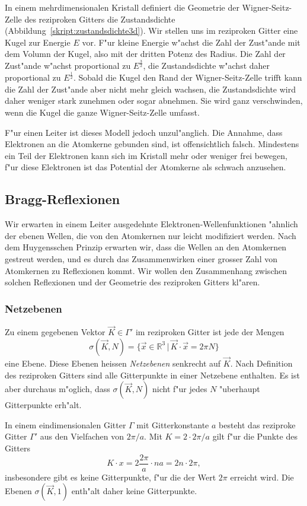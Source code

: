In einem mehrdimensionalen Kristall definiert die Geometrie der
Wigner-Seitz-Zelle des reziproken Gitters die Zustandsdichte
(Abbildung~\ref{skript:zustandsdichte3d}).
Wir stellen uns im reziproken Gitter eine Kugel zur Energie $E$ vor.
F"ur kleine Energie w"achst die Zahl der Zust"ande mit dem Volumn der
Kugel, also mit der dritten Potenz des Radius. Die Zahl der Zust"ande
w"achst proportional zu $E^{\frac32}$, die Zustandsdichte w"achst daher
proportional zu $E^{\frac12}$.
Sobald die Kugel den Rand der Wigner-Seitz-Zelle trifft kann die 
Zahl der Zust"ande aber nicht mehr gleich wachsen, die Zustandsdichte
wird daher weniger stark zunehmen oder sogar abnehmen.
Sie wird ganz verschwinden, wenn die Kugel die ganze Wigner-Seitz-Zelle
umfasst.

F"ur einen Leiter ist dieses Modell jedoch unzul"anglich.
Die Annahme, dass Elektronen an die Atomkerne gebunden sind, ist offensichtlich
falsch.
Mindestens ein Teil der Elektronen kann sich im Kristall mehr oder weniger
frei bewegen, f"ur diese Elektronen ist das Potential der Atomkerne
als schwach anzusehen.

\subsection{Bragg-Reflexionen}
Wir erwarten in einem Leiter ausgedehnte Elektronen-Wellenfunktionen
"ahnlich der ebenen Wellen, die von den Atomkernen nur leicht modifiziert
werden.
Nach dem Huygensschen Prinzip erwarten wir, dass die Wellen an den
Atomkernen gestreut werden, und es durch das Zusammenwirken einer grosser
Zahl von Atomkernen zu Reflexionen kommt.
Wir wollen den Zusammenhang zwischen solchen Reflexionen und der Geometrie
des reziproken Gitters kl"aren.

\subsubsection{Netzebenen}
Zu einem gegebenen Vektor $\vec K\in \Gamma'$ im reziproken Gitter ist
jede der Mengen
\[
\sigma(\vec K,N)=\{ \vec x\in \mathbb R^3\,|\, \vec K\cdot \vec x=2\pi N\}
\]
eine Ebene.
Diese Ebenen heissen {\em Netzebenen} senkrecht auf $\vec K$.
%
Nach Definition des reziproken Gitters sind alle Gitterpunkte in
einer Netzebene enthalten. 
Es ist aber durchaus m"oglich, dass $\sigma(\vec K,N)$ nicht
f"ur jedes $N$ "uberhaupt Gitterpunkte erh"alt.

\begin{beispiel}
In einem eindimensionalen Gitter $\Gamma$ mit Gitterkonstante $a$ besteht das
reziproke Gitter $\Gamma'$ aus den Vielfachen von $2\pi/a$.
Mit $K=2\cdot 2\pi/a$ gilt f"ur die Punkte des Gitters
\[
K\cdot x=2\frac{2\pi}a\cdot na=2n\cdot 2\pi,
\]
insbesondere gibt es keine Gitterpunkte, f"ur die der Wert $2\pi$
erreicht wird.
Die Ebenen $\sigma(\vec K,1)$ enth"alt daher keine Gitterpunkte.
\end{beispiel}

